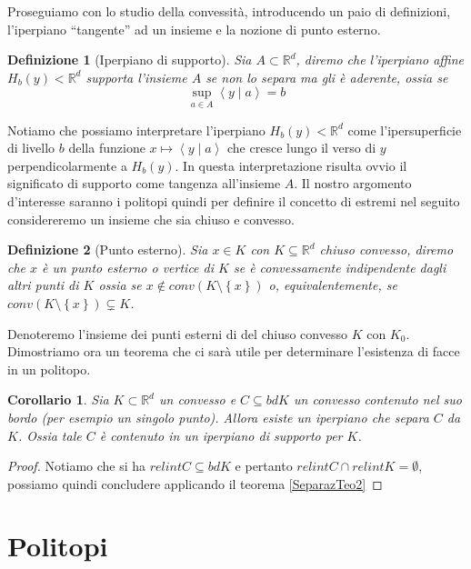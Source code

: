 \documentclass[a4paper,12pt,italian]{article}
\newcommand{\Rd}{\mathbb{R}^d}
\newtheorem{defin}{Definizione}
\newtheorem{cor}{Corollario}
\begin{document}
Proseguiamo con lo studio della convessit\`a, introducendo un paio di definizioni, l'iperpiano ``tangente'' ad un insieme e la nozione di
punto esterno.
\begin{defin}[Iperpiano di supporto]
Sia $A\subset\Rd$, diremo che l'iperpiano affine $H_b(y)<\Rd$ \emph{supporta} l'insieme $A$ se non lo separa ma gli \`e aderente, ossia se
\begin{equation*}
\sup_{a\in A}\left<y\mid a\right>=b
\end{equation*}
\end{defin}
Notiamo che possiamo interpretare l'iperpiano $H_b(y)<\Rd$ come l'ipersuperficie di livello $b$ della funzione $x\mapsto\left<y\mid a\right>$
che cresce lungo il verso di $y$ perpendicolarmente a $H_b(y)$. In questa interpretazione risulta ovvio il significato di supporto
come tangenza all'insieme $A$.
Il nostro argomento d'interesse saranno i politopi quindi per definire il concetto di estremi nel seguito considereremo un insieme 
che sia chiuso e convesso.
\begin{defin}[Punto esterno]
Sia $x\in K$ con $K\subseteq\Rd$ chiuso convesso, diremo che $x$ \`e un punto \emph{esterno} o \emph{vertice} di $K$ se \`e convessamente
indipendente dagli altri punti di $K$
ossia se $x\notin conv(K\setminus\left\{x\right\})$ o, equivalentemente, se $conv(K\setminus\left\{x\right\})\subsetneq K$.
\end{defin}
Denoteremo l'insieme dei punti esterni di del chiuso convesso $K$ con $K_0$.\\
Dimostriamo ora un teorema che ci sar\`a utile per determinare l'esistenza di facce in un politopo.
\begin{cor}
\label{IperSuppCor1}
Sia $K\subset\Rd$ un convesso e $C\subseteq bdK$ un convesso contenuto nel suo bordo (per esempio un singolo punto). Allora esiste un
iperpiano che separa $C$ da $K$.
Ossia tale $C$ \`e contenuto in un iperpiano di supporto per $K$.
\end{cor}
\begin{proof}
Notiamo che si ha $relintC\subseteq bdK$ e pertanto $relintC\cap relintK=\emptyset$, possiamo quindi concludere applicando il teorema
\ref{SeparazTeo2}
\end{proof}



\section{Politopi}
\end{document}
